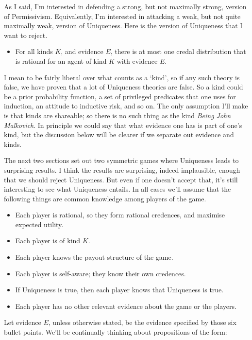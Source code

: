 \documentclass[
  11pt,
]{article}
\providecommand{\tightlist}{%
  \setlength{\itemsep}{0pt}\setlength{\parskip}{0pt}}
\begin{document}
As I said, I'm interested in defending a strong, but not maximally strong, version of Permissivism. Equivalently, I'm interested in attacking a weak, but not quite maximally weak, version of Uniqueness. Here is the version of Uniqueness that I want to reject.

\begin{itemize}
\tightlist
\item
  For all kinds \(K\), and evidence \(E\), there is at most one credal distribution that is rational for an agent of kind \(K\) with evidence \(E\).
\end{itemize}

I mean to be fairly liberal over what counts as a `kind', so if any such theory is false, we have proven that a lot of Uniqueness theories are false. So a kind could be a prior probability function, a set of privileged predicates that one uses for induction, an attitude to inductive risk, and so on. The only assumption I'll make is that kinds are shareable; so there is no such thing as the kind \emph{Being John Malkovich}. In principle we could say that what evidence one has is part of one's kind, but the discussion below will be clearer if we separate out evidence and kinds.

The next two sections set out two symmetric games where Uniqueness leads to surprising results. I think the results are surprising, indeed implausible, enough that we should reject Uniqueness. But even if one doesn't accept that, it's still interesting to see what Uniqueness entails. In all cases we'll assume that the following things are common knowledge among players of the game.

\begin{itemize}
\tightlist
\item
  Each player is rational, so they form rational credences, and maximise expected utility.
\item
  Each player is of kind \(K\).
\item
  Each player knows the payout structure of the game.
\item
  Each player is self-aware; they know their own credences.
\item
  If Uniqueness is true, then each player knows that Uniqueness is true.
\item
  Each player has no other relevant evidence about the game or the players.
\end{itemize}

Let evidence \(E\), unless otherwise stated, be the evidence specified by those six bullet points. We'll be continually thinking about propositions of the form:
\end{document}
